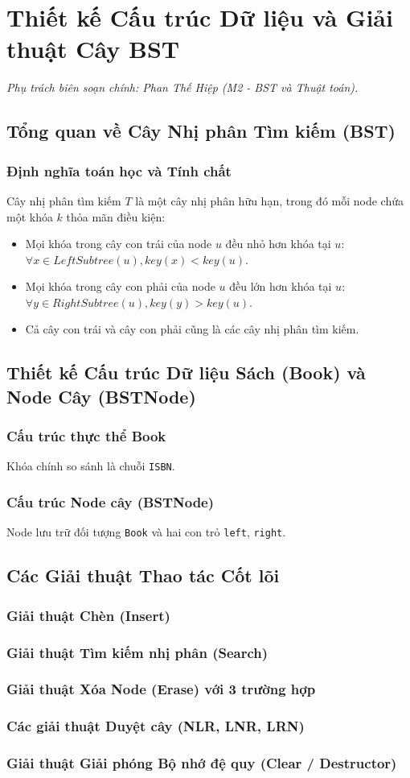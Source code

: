 \chapter{Thiết kế Cấu trúc Dữ liệu và Giải thuật Cây BST}
\label{chap:chuong2}

\textit{Phụ trách biên soạn chính: Phan Thế Hiệp (M2 - BST và Thuật toán).}

\section{Tổng quan về Cây Nhị phân Tìm kiếm (BST)}
\subsection{Định nghĩa toán học và Tính chất}
Cây nhị phân tìm kiếm $T$ là một cây nhị phân hữu hạn, trong đó mỗi node chứa một khóa $k$ thỏa mãn điều kiện:
\begin{itemize}
    \item Mọi khóa trong cây con trái của node $u$ đều nhỏ hơn khóa tại $u$: $\forall x \in LeftSubtree(u), key(x) < key(u)$.
    \item Mọi khóa trong cây con phải của node $u$ đều lớn hơn khóa tại $u$: $\forall y \in RightSubtree(u), key(y) > key(u)$.
    \item Cả cây con trái và cây con phải cũng là các cây nhị phân tìm kiếm.
\end{itemize}

\section{Thiết kế Cấu trúc Dữ liệu Sách (Book) và Node Cây (BSTNode)}
\subsection{Cấu trúc thực thể Book}
Khóa chính so sánh là chuỗi \texttt{ISBN}.
\subsection{Cấu trúc Node cây (BSTNode)}
Node lưu trữ đối tượng \texttt{Book} và hai con trỏ \texttt{left}, \texttt{right}.

\section{Các Giải thuật Thao tác Cốt lõi}
\subsection{Giải thuật Chèn (Insert)}
\subsection{Giải thuật Tìm kiếm nhị phân (Search)}
\subsection{Giải thuật Xóa Node (Erase) với 3 trường hợp}
\subsection{Các giải thuật Duyệt cây (NLR, LNR, LRN)}
\subsection{Giải thuật Giải phóng Bộ nhớ đệ quy (Clear / Destructor)}
